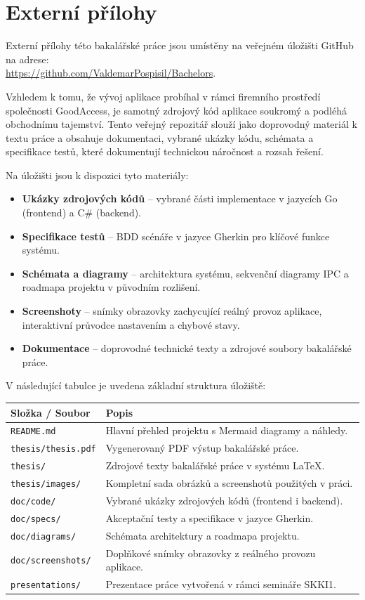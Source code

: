 \chapter{Externí přílohy\label{sec:ep}}

Externí přílohy této bakalářské práce jsou umístěny na veřejném úložišti GitHub na adrese:\\ \url{https://github.com/ValdemarPospisil/Bachelors}.

Vzhledem k tomu, že vývoj aplikace probíhal v rámci firemního prostředí společnosti GoodAccess, je samotný zdrojový kód aplikace soukromý a podléhá obchodnímu tajemství. Tento veřejný repozitář slouží jako doprovodný materiál k textu práce a obsahuje dokumentaci, vybrané ukázky kódu, schémata a specifikace testů, které dokumentují technickou náročnost a rozsah řešení.

Na úložišti jsou k dispozici tyto materiály:

\begin{itemize}
\item \textbf{Ukázky zdrojových kódů} – vybrané části implementace v jazycích Go (frontend) a C\# (backend).
\item \textbf{Specifikace testů} – BDD scénáře v jazyce Gherkin pro klíčové funkce systému.
\item \textbf{Schémata a diagramy} – architektura systému, sekvenční diagramy IPC a roadmapa projektu v původním rozlišení.
\item \textbf{Screenshoty} – snímky obrazovky zachycující reálný provoz aplikace, interaktivní průvodce nastavením a chybové stavy.
\item \textbf{Dokumentace} – doprovodné technické texty a zdrojové soubory bakalářské práce.
\end{itemize}

V následující tabulce je uvedena základní struktura úložiště:

\begin{longtable}{ll}
\hline
\textbf{Složka / Soubor} & \textbf{Popis} \\
\hline
\texttt{README.md} & Hlavní přehled projektu s Mermaid diagramy a náhledy. \\
\texttt{thesis/thesis.pdf} & Vygenerovaný PDF výstup bakalářské práce. \\
\texttt{thesis/} & Zdrojové texty bakalářské práce v systému \LaTeX{}. \\
\texttt{thesis/images/} & Kompletní sada obrázků a screenshotů použitých v práci. \\
\texttt{doc/code/} & Vybrané ukázky zdrojových kódů (frontend i backend). \\
\texttt{doc/specs/} & Akceptační testy a specifikace v jazyce Gherkin. \\
\texttt{doc/diagrams/} & Schémata architektury a roadmapa projektu. \\
\texttt{doc/screenshots/} & Doplňkové snímky obrazovky z reálného provozu aplikace. \\
\texttt{presentations/} & Prezentace práce vytvořená v rámci semináře SKKI1. \\
\hline
\end{longtable}

